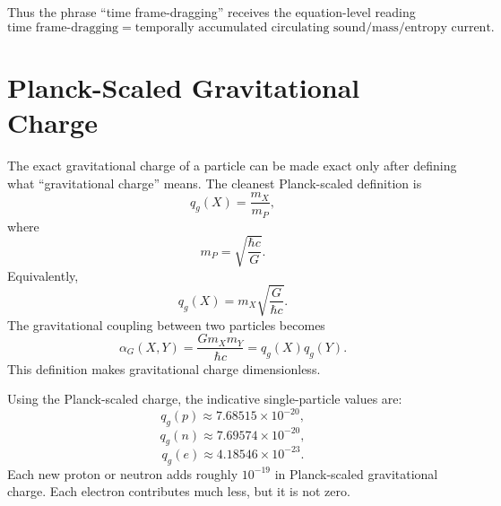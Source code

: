 \documentclass[11pt,a4paper]{article}
\renewcommand{\boxed}[1]{#1}
\begin{document}
Thus the phrase ``time frame-dragging'' receives the equation-level reading
\begin{equation}
\boxed{
\text{time frame-dragging}
=
\text{temporally accumulated circulating sound/mass/entropy current}.
}
\label{eq:time-frame-dragging-plain}
\end{equation}

\section{Planck-Scaled Gravitational Charge}

The exact gravitational charge of a particle can be made exact only after defining what ``gravitational charge'' means. The cleanest Planck-scaled definition is
\begin{equation}
\boxed{q_g(X)=\frac{m_X}{m_P},}
\label{eq:qg}
\end{equation}
where
\begin{equation}
\boxed{m_P=\sqrt{\frac{\hbar c}{G}}.}
\label{eq:planck-mass}
\end{equation}
Equivalently,
\begin{equation}
\boxed{q_g(X)=m_X\sqrt{\frac{G}{\hbar c}}.}
\label{eq:qg-equivalent}
\end{equation}
The gravitational coupling between two particles becomes
\begin{equation}
\boxed{
\alpha_G(X,Y)=\frac{Gm_Xm_Y}{\hbar c}=q_g(X)q_g(Y).
}
\label{eq:alpha-g}
\end{equation}
This definition makes gravitational charge dimensionless.

Using the Planck-scaled charge, the indicative single-particle values are:
\begin{equation}
\boxed{q_g(p)\approx 7.68515\times 10^{-20},}
\label{eq:q-proton}
\end{equation}
\begin{equation}
\boxed{q_g(n)\approx 7.69574\times 10^{-20},}
\label{eq:q-neutron}
\end{equation}
\begin{equation}
\boxed{q_g(e)\approx 4.18546\times 10^{-23}.}
\label{eq:q-electron}
\end{equation}
Each new proton or neutron adds roughly $10^{-19}$ in Planck-scaled gravitational charge. Each electron contributes much less, but it is not zero.
\end{document}
